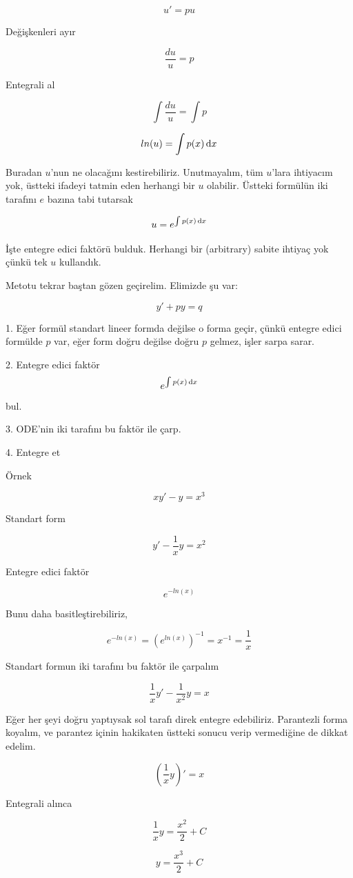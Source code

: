 \documentclass[12pt,fleqn]{article}\usepackage{../../common}
\begin{document}
$$ u' = pu $$

Değişkenleri ayır

$$ \frac{du}{u} = p $$

Entegrali al

$$ \int \frac{du}{u}  = \int p $$

$$ ln (u) = \int p(x) \,\mathrm{d} x $$

Buradan $u$'nun ne olacağını kestirebiliriz. Unutmayalım, tüm $u$'lara
ihtiyacım yok, üstteki ifadeyi tatmin eden herhangi bir $u$
olabilir. Üstteki formülün iki tarafını $e$ bazına tabi tutarsak

$$ u = e^{\int p(x) \,\mathrm{d} x} $$

İşte entegre edici faktörü bulduk. Herhangi bir (arbitrary) sabite ihtiyaç
yok çünkü tek $u$ kullandık.

Metotu tekrar baştan gözen geçirelim. Elimizde şu var:

$$ y'+py = q $$

1. Eğer formül standart lineer formda değilse o forma geçir, çünkü
entegre edici formülde $p$ var, eğer form doğru değilse doğru $p$
gelmez, işler sarpa sarar.

2. Entegre edici faktör $$ e^{\int p(x) \,\mathrm{d} x} $$ bul.

3. ODE'nin iki tarafını bu faktör ile çarp.

4. Entegre et

Örnek

$$ xy' - y= x^3 $$

Standart form

$$ y' - \frac{1}{x}y = x^2 $$

Entegre edici faktör

$$ e^{-ln(x)} $$

Bunu daha basitleştirebiliriz,

$$ e^{-ln(x)} = (e^{ln(x)})^{-1} = x^{-1} = \frac{1}{x}  $$

Standart formun iki tarafını bu faktör ile çarpalım

$$ \frac{1}{x}y' - \frac{1}{x^2}y = x $$

Eğer her şeyi doğru yaptıysak sol tarafı direk entegre
edebiliriz. Parantezli forma koyalım, ve parantez içinin hakikaten
üstteki sonucu verip vermediğine de dikkat edelim.

$$ (\frac{1}{x}y)' = x $$

Entegrali alınca

$$ \frac{1}{x}y = \frac{x^2}{2} + C $$

$$ y = \frac{x^3}{2} + C $$
\end{document}
